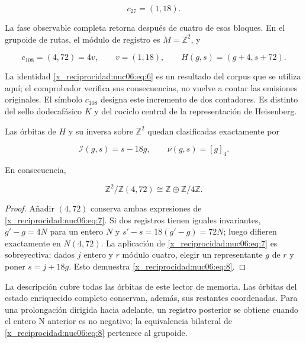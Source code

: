 \[
c_{27}=(1,18).
\]

La fase observable completa retorna después de cuatro de esos bloques. En el grupoide de rutas, el módulo de registro es \(M=\mathbb Z^2\), y

\begin{equation}
c_{108}=(4,72)=4v,\qquad v=(1,18),\qquad
H(g,s)=(g+4,s+72).
\label{x_reciprocidad:nuc06:eq:6}
\end{equation}

La identidad \eqref{x_reciprocidad:nuc06:eq:6} es un resultado del corpus que se utiliza aquí; el comprobador verifica sus consecuencias, no vuelve a contar las emisiones originales. El símbolo \(c_{108}\) designa este incremento de dos contadores. Es distinto del sello dodecafásico \(K\) y del cociclo central de la representación de Heisenberg.

\begin{theorem}

Las órbitas de \(H\) y su inversa sobre \(\mathbb Z^2\) quedan clasificadas exactamente por

\begin{equation}
\boxed{\quad \mathcal I(g,s)=s-18g,\qquad \nu(g,s)=[g]_4.\quad}
\label{x_reciprocidad:nuc06:eq:7}
\end{equation}

En consecuencia,

\begin{equation}
\mathbb Z^2/\mathbb Z(4,72)\cong\mathbb Z\oplus\mathbb Z/4\mathbb Z.
\label{x_reciprocidad:nuc06:eq:8}
\end{equation}
\end{theorem}

\begin{proof}
Añadir \((4,72)\) conserva ambas expresiones de \eqref{x_reciprocidad:nuc06:eq:7}. Si dos registros tienen iguales invariantes, \(g'-g=4N\) para un entero \(N\) y \(s'-s=18(g'-g)=72N\); luego difieren exactamente en \(N(4,72)\). La aplicación de \eqref{x_reciprocidad:nuc06:eq:7} es sobreyectiva: dados \(j\) entero y \(r\) módulo cuatro, elegir un representante \(g\) de \(r\) y poner \(s=j+18g\). Esto demuestra \eqref{x_reciprocidad:nuc06:eq:8}.
\end{proof}

La descripción cubre todas las órbitas de este lector de memoria. Las órbitas del estado enriquecido completo conservan, además, sus restantes coordenadas. Para una prolongación dirigida hacia adelante, un registro posterior se obtiene cuando el entero N anterior es no negativo; la equivalencia bilateral de \eqref{x_reciprocidad:nuc06:eq:8} pertenece al grupoide.

